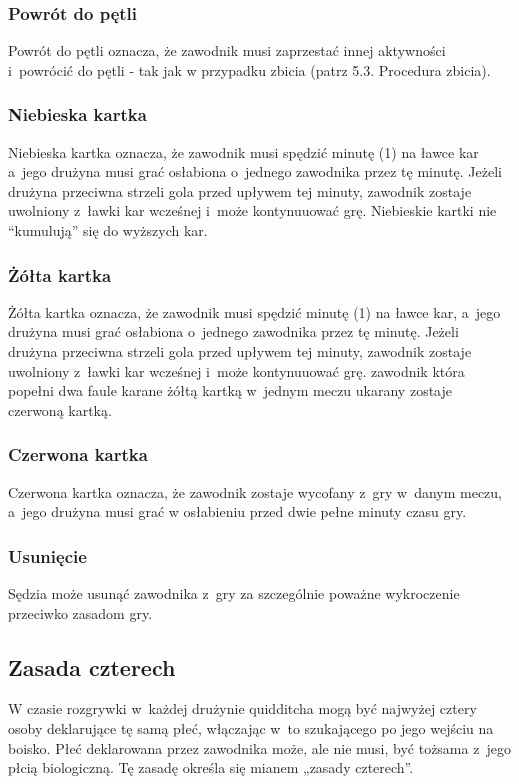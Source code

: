 \documentclass[12pt]{article}
\begin{document}
\subsubsection{Powrót do pętli}
Powrót do pętli oznacza, że
zawodnik musi zaprzestać innej aktywności i~powrócić do pętli - tak jak
w przypadku zbicia (patrz 5.3. Procedura zbicia).

\subsubsection{Niebieska kartka}
Niebieska kartka oznacza, że
zawodnik musi spędzić minutę (1) na ławce kar a~jego drużyna musi grać
osłabiona o~jednego zawodnika przez tę minutę. Jeżeli drużyna przeciwna
strzeli gola przed upływem tej minuty, zawodnik zostaje uwolniony z~ławki kar wcześnej i~może kontynuuować grę. Niebieskie kartki nie
``kumulują'' się do wyższych kar.

\subsubsection{Żółta kartka}
Żółta kartka oznacza, że
zawodnik musi spędzić minutę (1) na ławce kar, a~jego drużyna musi grać
osłabiona o~jednego zawodnika przez tę minutę. Jeżeli drużyna przeciwna
strzeli gola przed upływem tej minuty, zawodnik zostaje uwolniony z~ławki kar wcześnej i~może kontynuuować grę. zawodnik która popełni dwa
faule karane żółtą kartką w~jednym meczu ukarany zostaje czerwoną
kartką.

\subsubsection{Czerwona kartka}
Czerwona kartka oznacza, że
zawodnik zostaje wycofany z~gry w~danym meczu, a~jego drużyna musi grać
w osłabieniu przed dwie pełne minuty czasu gry.

\subsubsection{Usunięcie}
Sędzia może usunąć zawodnika z~gry za
szczególnie poważne wykroczenie przeciwko zasadom gry.

\subsection{Zasada czterech}
W czasie rozgrywki w~każdej drużynie quidditcha mogą być najwyżej cztery
osoby deklarujące tę samą płeć, włączając w~to szukającego po jego
wejściu na boisko. Płeć deklarowana przez zawodnika może, ale nie musi,
być tożsama z~jego płcią biologiczną. Tę zasadę określa się mianem
„zasady czterech''.
\end{document}

